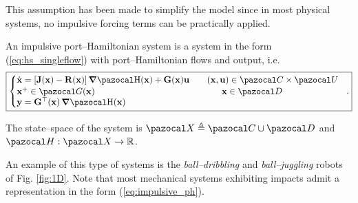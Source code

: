 This assumption has been made to simplify the model since in most physical systems, no impulsive forcing terms can be practically applied.
%
\begin{defn}
%
An impulsive port--Hamiltonian system is a system in the form (\ref{eq:hs_singleflow})  with port--Hamiltonian flows and output, i.e.
%
\begin{equation}\label{eq:impulsive_ph}
    \boxed{
    \left\{ 
        \begin{matrix*}[l]\vspace{1pt}
            \dot{\xb} = \left[\Jb(\xb)-\Rb(\xb)\right]\dH(\xb) + \Gb(\xb)\ub && (\xb,\ub)\in\C\times\U\\
            \xb^+ \in \G(\xb)&&\quad~~ \xb\in\D\\
            \yb = \Gb^\top(\xb)\dH(\xb)
        \end{matrix*}
    \right.~~.
    }
\end{equation}
%

The state--space of the system is $\X\triangleq\C\cup\D$ and $\Ha:\X\rightarrow\R$.
\end{defn}
%
An example of this type of systems is the \textit{ball--dribbling} and \textit{ball--juggling} robots of Fig. \ref{fig:1D}. Note that most mechanical systems exhibiting impacts admit a representation in the form (\ref{eq:impulsive_ph}).
%
